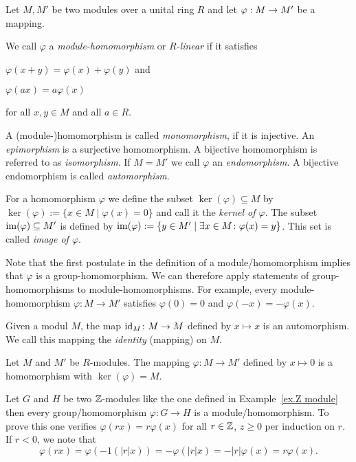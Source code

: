  \begin{defin}
Let $M,M'$ be two modules over a unital ring $R$ and let $\varphi : M \rightarrow M'$ be a mapping. 
\begin{thmlist}
\item We call $\varphi$ a \emph{module-homomorphism} or \textit{$R$-linear} if it satisfies
\begin{exlist}
\item $\varphi(x+y)=\varphi(x)+\varphi(y)$ and
\item $\varphi(ax)=a\varphi(x)$
\end{exlist}
for all $x,y \in M$ and all $a \in R$.
\item A (module-)homomorphism is called \textit{monomorphism}, if it is injective. An \emph{epimorphism} is a surjective homomorphism. A bijective homomorphism is referred to as \textit{isomorphism}. If $M=M'$ we call $\varphi$ an \textit{endomorphism}. A bijective endomorphism is called \textit{automorphism}.
\item For a homomorphism $\varphi$ we define the subset $\ker(\varphi)\subseteq M$ by $\ker(\varphi):=\lbrace x\in M \mid \varphi(x)=0\rbrace$ and call it the \emph{kernel of $\varphi$}. The subset $\operatorname{im}(\varphi)\subseteq M'$ is defined by $\operatorname{im}(\varphi):=\lbrace y\in M' \mid \exists x\in M\colon \varphi(x)=y\rbrace$. This set is called \emph{image of $\varphi$}.
\end{thmlist}
\end{defin}

Note that the first postulate in the definition of a module\-/homomorphism implies that $\varphi$ is a group-homomorphism. We can therefore apply statements of group-homomorphisms to mo\-dule-ho\-mo\-morph\-isms. For example, every mo\-dule-ho\-mo\-morph\-ism $\varphi\colon M\rightarrow M'$ satisfies $\varphi(0)=0$ and $\varphi(-x)=-\varphi(x)$.

\begin{exam}
\begin{exlist}
\item Given a modul $M$, the map $\operatorname{id}_M\colon M \rightarrow M$ defined by $x\mapsto x$ is an automorphism. We  call this mapping the \emph{identity} (mapping) on $M$.
\item Let $M$ and $M'$ be $R$-modules. The mapping $\varphi\colon M\rightarrow M'$ defined by $x\mapsto 0$ is a homomorphism with $\ker(\varphi)=M$. 
\item Let $G$ and $H$ be two $\operatorname{\mathbb{Z}}$-modules like the one defined in Example~\ref{ex.Z module} then every group\-/homomorphism $\varphi\colon G\rightarrow H$ is a module\-/homomorphism. %
To prove this one verifies $\varphi(rx)=r\varphi(x)$ for all $r\in\operatorname{\mathbb{Z}}$, $z\geq 0$ per induction on $r$. If $r<0$, we note that 
\begin{equation*}
\varphi(rx)=\varphi(-1(\lvert r\rvert x))=-\varphi(\lvert r\rvert x)=-\lvert r\rvert\varphi(x)=r\varphi(x).
\end{equation*}
\end{exlist}
\end{exam}

